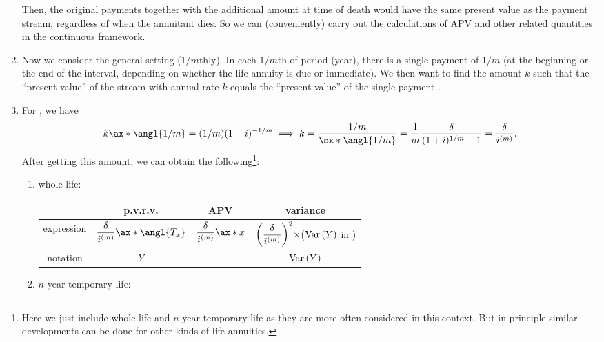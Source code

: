 \begin{enumerate}
Then, the original payments  together with the
additional amount at time of death would have the same present value as the
payment stream, regardless of when the annuitant dies. So we can (conveniently)
carry out the calculations of APV and other related quantities in the
continuous framework.

\item Now we consider the general setting (\(1/m\)thly). In each \(1/m\)th of
period (year), there is a single payment  of \(1/m\)
(at the beginning or the end of the interval, depending on whether the life
annuity is due or immediate). We then want to find the amount \(k\) such that
the ``present value'' of the stream with annual rate \(k\) equals the ``present
value'' of the single payment .

\item \label{it:complete-1m-annuity-fmlas}
For , we have
\[
k\ax*{\angl{1/m}}=(1/m)(1+i)^{-1/m}
\implies
k=\frac{1/m}{\sx*{\angl{1/m}}}
=\frac{1}{m}\frac{\delta}{(1+i)^{1/m}-1}
=\frac{\delta}{i^{(m)}}.
\]
After getting this amount, we can obtain the following\footnote{Here we just
include whole life and \(n\)-year temporary life as they are more often
considered in this context. But in principle similar developments can be done
for other kinds of life annuities.}:
\begin{enumerate}
\item whole life:

\begin{tabular}{cccc}
\toprule
&p.v.r.v.&APV&variance\\
\midrule
expression&\(\displaystyle \frac{\delta}{i^{(m)}}\ax*{\angl{T_x}}\)
&\(\displaystyle \frac{\delta}{i^{(m)}}\ax*{x}\)
&\(\displaystyle \qty(\frac{\delta}{i^{(m)}})^2\times\)(\(\operatorname{Var}\qty(Y)\) in {it:cts-wl-annuity-fmlas})\\
notation&\(Y\)&{\(\aringx{x}[(m)]\)}&\(\operatorname{Var}\qty(Y)\)\\
\bottomrule
\end{tabular}

\item \(n\)-year temporary life:


\end{enumerate}
\end{enumerate}
